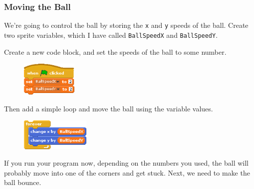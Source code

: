 		\subsubsection{Moving the Ball}
		
			We're going to control the ball by storing the \texttt{x} and \texttt{y} speeds of the ball. Create two sprite variables, which I have called \texttt{BallSpeedX} and \texttt{BallSpeedY}.
			
			Create a new code block, and set the speeds of the ball to some number.
			
			\begin{figure}[h!]
				\centering
				\includegraphics[width=101px]{McrRaspJam/018_ScratchGames/code/3_ballmove1}
				\label{fig:ballmove1}
			\end{figure}
		
			Then add a simple loop and move the ball using the variable values.
			
			\begin{figure}[h!]
				\centering
				\includegraphics[width=125px]{McrRaspJam/018_ScratchGames/code/3_ballmove2}
				\label{fig:ballmove2}
			\end{figure}
		
			If you run your program now, depending on the numbers you used, the ball will probably move into one of the corners and get stuck. Next, we need to make the ball bounce.
			

		
